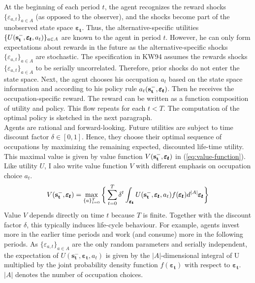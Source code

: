 \documentclass[a4paper,12pt]{article}
\begin{document}
\noindent
At the beginning of each period $t$, the agent recognizes the reward shocks $\{\varepsilon_{a,t}\}_{a \in A}$ (as opposed to the observer), and the shocks become part of the unobserved state space $\pmb{\varepsilon_t}$. Thus, the alternative-specific utilities $\{U(\bold{s_t^-}, \pmb{\varepsilon_t},a_t)\}_{a \in A}$ are known to the agent in period $t$. However, he can only form expectations about rewards in the future as the alternative-specific shocks $\{\varepsilon_{a,t}\}_{a \in A}$ are stochastic. The specification in KW94 assumes the rewards shocks $\{\varepsilon_{a,t}\}_{a \in A}$ to be serially uncorrelated. Therefore, prior shocks do not enter the state space. Next, the agent chooses his occupation $a_t$ based on the state space information and according to his policy rule $a_t(\bold{s_t^-}, \pmb{\varepsilon_t})$. Then he receives the occupation-specific reward. The reward can be written as a function composition of utility and policy. This flow repeats for each $t < T$. The computation of the optimal policy is sketched in the next paragraph.\\
\newline
Agents are rational and forward-looking. Future utilities are subject to time discount factor $\delta  \in [0,1]$. Hence, they choose their optimal sequence of occupations by maximizing the remaining expected, discounted life-time utility. This maximal value is given by value function $V(\bold{s_t^-}, \pmb{\varepsilon_t})$ in (\ref{eq:value-function}). Like utility $U$, I also write value function $V$ with different emphasis on occupation choice $a_t$.
\begin{align} \label{eq:value-function}
V(\bold{s_t^-}, \pmb{\varepsilon_t}) = \max_{\{a\}_{t=0}^T} \bigg\{ \sum_{t=0}^T \delta^t \int_{\pmb{\varepsilon_t}} U(\bold{s_{t}^{-}},\pmb{\varepsilon_{t}}, a_{t}) f(\pmb{\varepsilon_{t}})d^{|A|}\pmb{\varepsilon_{t}}\bigg\}
\end{align}
Value $V$ depends directly on time $t$ because $T$ is finite. Together with the discount factor $\delta$, this typically induces life-cycle behaviour. For example, agents invest more in the earlier time periods and work (and consume) more in the following periods. As $\{\varepsilon_{a,t}\}_{a \in A}$ are the only random parameters and serially independent, the expectation of $U(\bm{s_{t}^{-}},\pmb{\varepsilon_{t}}, a_{t})$ is given by the $|A|$-dimensional integral of U multiplied by the joint probability density function $f(\pmb{\varepsilon_{t}})$ with respect to $\pmb{\varepsilon_{t}}$. $|A|$ denotes the number of occupation choices.
\end{document}
